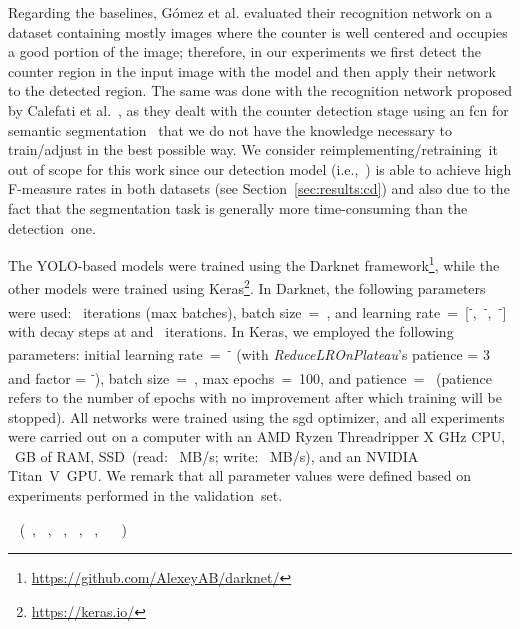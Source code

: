 Regarding the baselines, Gómez et al.\cite{gomez2018cutting} evaluated their recognition network on a dataset containing mostly images where the counter is well centered and occupies a good portion of the image; therefore, in our experiments we first detect the counter region in the input image with the \detnet model and then apply their network to the detected region.
The same was done with the recognition network proposed by Calefati et al.~\cite{calefati2019reading}, as they dealt with the counter detection stage using an \gls*{fcn} for semantic segmentation~\cite{long2015fully} that we do not have the knowledge necessary to train/adjust in the best possible way.
We consider reimplementing/retraining~it out of scope for this work since our detection model (i.e.,~\detnet) is able to achieve high F-measure rates in both datasets (see Section~\ref{sec:results:cd}) and also due to the fact that the segmentation task is generally more time-consuming than the detection~one.

The YOLO-based models were trained using the Darknet framework\footnote{\url{https://github.com/AlexeyAB/darknet/}}, while the other models were trained using Keras\footnote{\url{https://keras.io/}}. 
In Darknet, the following parameters were used:~ iterations (max batches), batch size~=~, and learning rate~=~[\textsuperscript{-},~\textsuperscript{-},~\textsuperscript{-}] with decay steps at  and ~iterations.
In Keras, we employed the following parameters: initial learning rate~=~\textsuperscript{-} (with \textit{ReduceLROnPlateau}'s patience = 3 and factor = \textsuperscript{-}), batch size~=~, max epochs~=~100, and patience~=~ (patience refers to the number of epochs with no improvement after which training will be stopped).
All networks were trained using the \gls*{sgd} optimizer, and all experiments were carried out on a computer with an AMD Ryzen Threadripper X GHz CPU, ~GB of RAM, SSD~(read: ~MB/s; write: ~MB/s), and an NVIDIA Titan~V~GPU. 
We remark that all parameter values were defined based on experiments performed in the validation~set.

~\cite{clovaai} (~\cite{shi2017endtoend}, ~\cite{shi2016robust}, ~\cite{lee2016recursive}, ~\cite{liu2016starnet}, ~\cite{wang2017deep}, ~\cite{borisyuk2018rosetta} ~\cite{baek2019what})~\cite{shi2017endtoend}~\cite{baek2019what}



